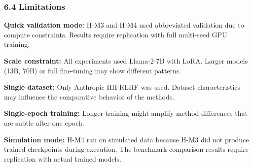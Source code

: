 \subsubsection{6.4 Limitations}

\textbf{Quick validation mode:} H-M3 and H-M4 used abbreviated validation due to compute constraints. Results require replication with full multi-seed GPU training.

\textbf{Scale constraint:} All experiments used Llama-2-7B with LoRA. Larger models (13B, 70B) or full fine-tuning may show different patterns.

\textbf{Single dataset:} Only Anthropic HH-RLHF was used. Dataset characteristics may influence the comparative behavior of the methods.

\textbf{Single-epoch training:} Longer training might amplify method differences that are subtle after one epoch.

\textbf{Simulation mode:} H-M4 ran on simulated data because H-M3 did not produce trained checkpoints during execution. The benchmark comparison results require replication with actual trained models.

